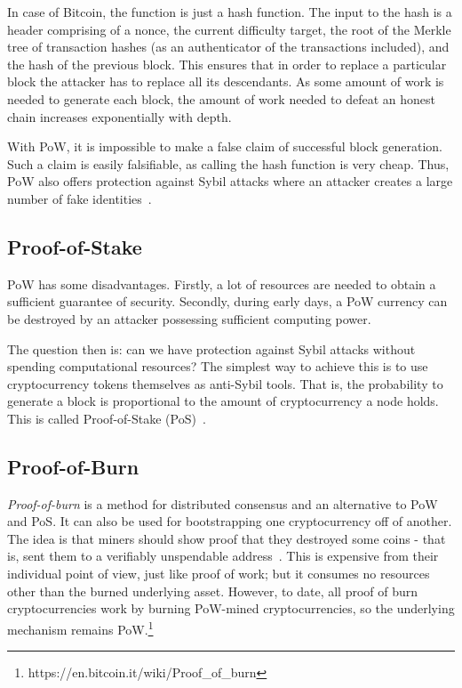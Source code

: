 \documentclass[]{report}   %
\begin{document}
In case of Bitcoin, the function is just a hash function. The input to the hash is a header comprising of a nonce, the current difficulty target, the root of the Merkle tree of transaction hashes (as an authenticator of the transactions included), and the hash of the previous block. This ensures that in order to replace a particular block the attacker has to replace all its descendants. As some amount of work is needed to generate each block, the amount of work needed to defeat an honest chain increases exponentially with depth.

With PoW, it is impossible to make a false claim of successful block generation. Such a claim is easily falsifiable, as calling the hash function is very cheap. Thus, PoW also offers protection against Sybil attacks where an attacker creates a large number of fake identities~\cite{douceur2002sybil}.

\subsection{Proof-of-Stake}

PoW has some disadvantages. Firstly, a lot of resources are needed to obtain a sufficient guarantee of security. Secondly, during early days, a PoW currency can be destroyed by an attacker possessing sufficient computing power. 

The question then is: can we have protection against Sybil attacks without spending computational resources? 
The simplest way to achieve this is to use cryptocurrency tokens themselves as anti-Sybil tools. 
That is, the probability to generate a block is proportional to the amount of cryptocurrency a node holds. This is called Proof-of-Stake (PoS)~\cite{kiayias2016provably,king2012ppcoin}.

\subsection{Proof-of-Burn}

{\em Proof-of-burn} is a method for distributed consensus and an alternative to PoW and PoS. It can also be used for bootstrapping one cryptocurrency off of another.
The idea is that miners should show proof that they destroyed some coins - that is, sent them to a verifiably unspendable address~\cite{stewart2012proof}. This is expensive from their individual point of view, just like proof of work; but it consumes no resources other than the burned underlying asset. However, to date, all proof of burn cryptocurrencies work by burning PoW-mined cryptocurrencies, so the underlying mechanism remains PoW.\footnote{https://en.bitcoin.it/wiki/Proof\_of\_burn}
\end{document}

